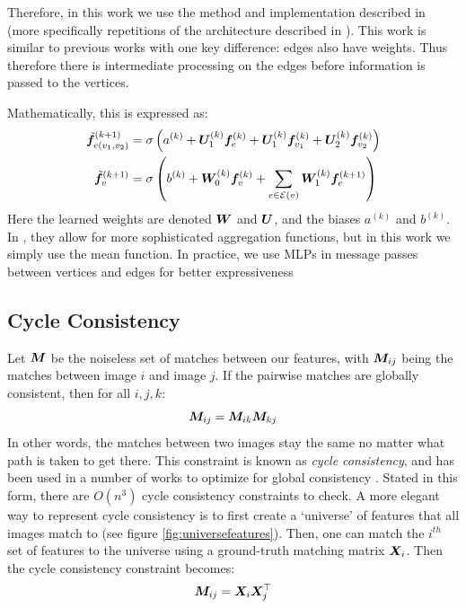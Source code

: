 \documentclass{article} %
\begin{document}
Therefore, in this work we use the method and implementation described in \cite{battaglia2018relational} (more specifically repetitions of the architecture described in \cite{battaglia2016interaction}).
This work is similar to previous works with one key difference: edges also have weights.
Thus therefore there is intermediate processing on the edges before information is passed to the vertices. 

Mathematically, this is expressed as: %
\begin{align}
\tilde{{\bm{f}}}_{e(v_1,v_2)}^{(k+1)} =&\; \sigma \left(a^{(k)} + {\bm{U}}_1^{(k)} {\bm{f}}_{e}^{(k)} + {\bm{U}}_1^{(k)} {\bm{f}}_{v_1}^{(k)} + {\bm{U}}_2^{(k)} {\bm{f}}_{v_2}^{(k)} \right) \\
\tilde{{\bm{f}}}_{v}^{(k+1)} =&\; \sigma\left(b^{(k)} + {\bm{W}}_0^{(k)} {\bm{f}}_{v}^{(k)} + \sum_{e \in \mathcal{E}(v)} {\bm{W}}_1^{(k)} {\bm{f}}_{e}^{(k+1)} \right) 
\end{align}
Here the learned weights are denoted ${\bm{W}}$ and ${\bm{U}}$, and the biases $a^{(k)}$ and  $b^{(k)}$.
In \cite{battaglia2018relational}, they allow for more sophisticated aggregation functions, but in this work we simply use the mean function.
In practice, we use MLPs in message passes between vertices and edges for better expressiveness


\subsection{Cycle Consistency}

Let ${\bm{M}}$ be the noiseless set of matches between our features, with ${\bm{M}}_{ij}$ being the matches between image $i$ and image $j$.
If the pairwise matches are globally consistent, then for all $i, j, k$:
\begin{equation}
{\bm{M}}_{ij} = {\bm{M}}_{ik} {\bm{M}}_{kj}
\label{eq:cycconsist1}
\end{equation}
In other words, the matches between two images stay the same no matter what path is taken to get there. 
This constraint is known as \textit{cycle consistency}, and has been used in a number of works to optimize for global consistency \cite{zhou2015multi, wang2017multi, leonardos2016distributed}.
Stated in this form, there are $O(n^3)$ cycle consistency constraints to check.
A more elegant way to represent cycle consistency is to first create a `universe' of features that all images match to (see figure \ref{fig:universefeatures}).
Then, one can match the $i^{th}$ set of features to the universe using a ground-truth matching matrix ${\bm{X}}_i$.
Then the cycle consistency constraint becomes:
\begin{equation}
{\bm{M}}_{ij} = {\bm{X}}_{i}{\bm{X}}_{j}^\top
\label{eq:cycconsist2}
\end{equation}
\end{document}

